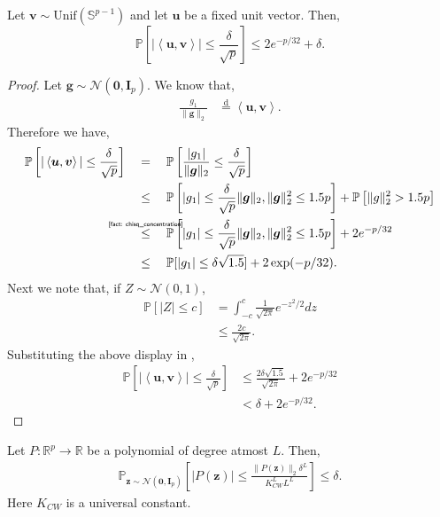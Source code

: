 \documentclass[final,12pt]{colt2018} %
\newcommand{\Prob}{\mathbb{P}}
\newcommand{\R}{\mathbb{R}}
\newcommand{\unitsphere}[1]{\mathbb{S}^{#1}}
\newcommand{\explain}[2]{\mathrel{\overset{\makebox[0pt]{\mbox{\normalfont\tiny\sffamily #1}}}{#2}}}
\newcommand{\eqdist}{\stackrel{\text{d}}{=}}
\newcommand{\gauss}[2]{\mathcal{N}\left( #1,#2 \right)}
\renewcommand\v[1]{{\ensuremath{\boldsymbol{#1}}}}
\newcommand\ip[1]{\left\langle #1 \right\rangle}
\begin{document}
\begin{lemma} Let $\v v \sim \text{Unif}(\unitsphere{p-1})$ and let $\v u$ be a fixed unit vector. Then,
$$\Prob \left[ |\ip{\v u, \v v}| \leq \frac{\delta}{\sqrt{p}} \right] \leq 2e^{-p/32} + \delta. $$
\label{lemma: anticoncentration}
\end{lemma}
\begin{proof}
Let $\v g \sim \gauss{\v 0}{\v I_p}$. We know that,
\begin{align*}
    \frac{g_1}{\| \v g \|_2} & \eqdist \ip{\v u,\v v}.
\end{align*}
Therefore we have,
\begin{align}
    \Prob \left[ |\ip{\v u, \v v}| \leq \frac{\delta}{\sqrt{p}} \right] & \quad=\quad \Prob \left[ \frac{|g_1|}{\| \v g \|_2} \leq \frac{\delta}{\sqrt{p}} \right] \nonumber \\
    & \quad\leq\quad \Prob\left[ |g_1| \leq \frac{\delta}{\sqrt{p}}\|\v g\|_2, \|\v g \|_2^2 \leq 1.5 p \right] + \Prob \left[ \|g\|^2_2 > 1.5p  \right] \nonumber \\
    & \quad\explain{\Cref{fact: chisq_concentration}}{\leq}\quad \Prob\left[ |g_1| \leq \frac{\delta}{\sqrt{p}}\|\v g\|_2, \|\v g \|_2^2 \leq 1.5 p \right] + 2e^{-p/32} \nonumber\\
    & \quad\leq\quad \Prob[|g_1| \leq \delta \sqrt{1.5}] + 2 \exp(-p/32). \label{equation: anticoncentration_lemma_eq}
\end{align}
Next we note that, if $Z \sim \gauss{0}{1}$,
\begin{align*}
    \Prob[|Z| \leq c] & = \int_{-c}^c \frac{1}{\sqrt{2\pi}} e^{-z^2/2} dz \\
    & \leq \frac{2c}{\sqrt{2\pi}}.
\end{align*}
Substituting the above display in ,
\begin{align*}
    \Prob \left[ |\ip{\v u, \v v}| \leq \frac{\delta}{\sqrt{p}} \right] & \leq \frac{2\delta \sqrt{1.5}}{\sqrt{2\pi}} + 2 e^{-p/32} \\
    & < \delta + 2 e^{-p/32}.
\end{align*}
\end{proof}
\begin{theorem} Let $P: \R^p \rightarrow \R$ be a polynomial of degree atmost $L$. Then,
\begin{align*}
    \Prob_{\v z \sim \gauss{\v 0}{\v I_p}} \left[ |P(\v z)| \leq \frac{\| P(\v z)\|_2 \delta ^L}{K_{CW}^L L^L}  \right] \leq \delta.
\end{align*}
Here $K_{CW}$ is a universal constant. 
\label{theorem: carbery-wright}
\end{theorem}
\end{document}
